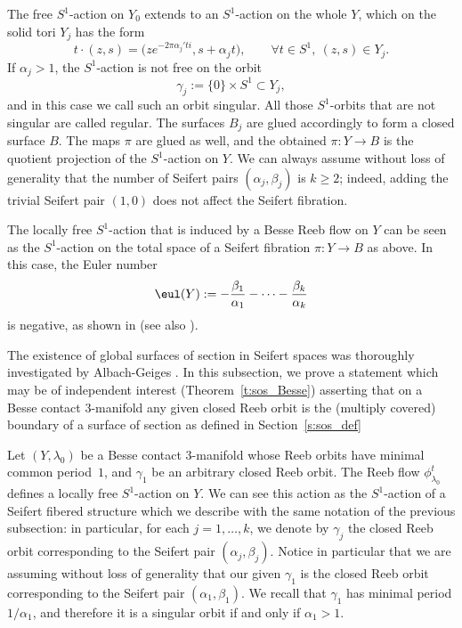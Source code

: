 The free $S^1$-action on $Y_0$ extends to an $S^1$-action on the whole $Y$, which on the solid tori $Y_j$ has the form\Changelback
\[
t\cdot(z,s)=\big(z e^{-2\pi\alpha_j't i},s+\alpha_j t\big),
\qquad
\forall t\in S^1,\ (z,s)\in Y_j.
\]
If $\alpha_j>1$, the $S^1$-action is not free on the orbit
\[
\gamma_j:=\{0\}\times S^1\subset Y_j,
\]
and in this case we call such an orbit singular. All those $S^1$-orbits that are not singular are called regular.
The surfaces $B_j$ are glued accordingly to form a closed surface $B$. The maps $\pi$ are glued as well, and the obtained $\pi:Y\to B$ is the quotient projection of the $S^1$-action on $Y$.
We can always assume without loss of generality that the number of Seifert pairs $(\alpha_j,\beta_j)$ is $k\geq2$; indeed, adding the trivial Seifert pair $(1,0)$ does not affect the Seifert fibration.

The locally free $S^1$-action that is induced by a Besse Reeb flow on $Y$ can be seen as the $S^1$-action on the total space of a Seifert fibration $\pi:Y\to B$ as above. In this case, the Euler number
\[
\eul(Y):=-\frac{\beta_1}{\alpha_1}-\dots-\frac{\beta_k}{\alpha_k}
\]
is negative, as shown in \cite{Lisca:2004oz} (see also \cite[Th.\,1.4]{Kegel:2021vo}).

\label{s:sos_Besse}
The existence of global surfaces of section in Seifert spaces was thoroughly investigated by Albach-Geiges \cite{Albach:2021wi}. In this subsection, we prove a statement which may be of independent interest (Theorem~\ref{t:sos_Besse}) asserting that on a Besse contact $3$-manifold any given closed Reeb orbit is the (multiply covered) boundary of a surface of section as defined in Section~\ref{s:sos_def}

Let $(Y,\lambda_0)$ be a Besse contact $3$-manifold whose Reeb orbits have minimal common period~$1$, and $\gamma_1$ be an arbitrary closed Reeb orbit. The Reeb flow $\phi_{\lambda_0}^t$ defines a locally free $S^1$-action on $Y$. We can see this action as the $S^1$-action of a Seifert fibered structure which we describe with the same notation of the previous subsection: in particular, for each $j=1,\dots,k$, we denote by $\gamma_j$ the closed Reeb orbit corresponding to the Seifert pair $(\alpha_j,\beta_j)$. Notice in particular that we are assuming without loss of generality that our given $\gamma_1$ is the closed Reeb orbit corresponding to the Seifert pair $(\alpha_1,\beta_1)$. We recall that $\gamma_1$ has minimal period $1/\alpha_1$, and therefore it is a singular orbit if and only if $\alpha_1>1$.

